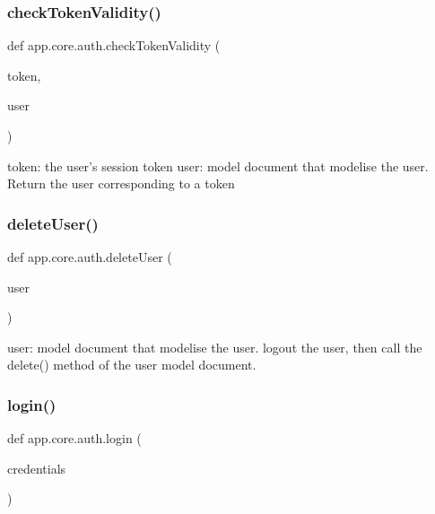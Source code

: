 \subsubsection{\texorpdfstring{check\+Token\+Validity()}{checkTokenValidity()}}
{\footnotesize\ttfamily def app.\+core.\+auth.\+check\+Token\+Validity (\begin{DoxyParamCaption}\item[{}]{token,  }\item[{}]{user }\end{DoxyParamCaption})}

\begin{DoxyVerb}token: the user's session token
user: model document that modelise the user.
Return the user corresponding to a token
\end{DoxyVerb}
 \mbox{\label{namespaceapp_1_1core_1_1auth_a06afba77de9ef8e1b6495e833678d1a4}} 
\subsubsection{\texorpdfstring{delete\+User()}{deleteUser()}}
{\footnotesize\ttfamily def app.\+core.\+auth.\+delete\+User (\begin{DoxyParamCaption}\item[{}]{user }\end{DoxyParamCaption})}

\begin{DoxyVerb}user: model document that modelise the user.
logout the user, then call the delete() method of the user model document.
\end{DoxyVerb}
 \mbox{\label{namespaceapp_1_1core_1_1auth_aa8cecbd33848dc04dbe5de74e5529124}} 
\subsubsection{\texorpdfstring{login()}{login()}}
{\footnotesize\ttfamily def app.\+core.\+auth.\+login (\begin{DoxyParamCaption}\item[{}]{credentials }\end{DoxyParamCaption})}

